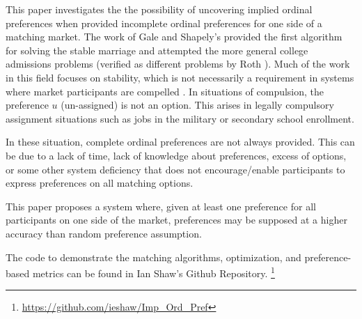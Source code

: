 This paper investigates the the possibility of uncovering implied ordinal preferences when provided incomplete ordinal preferences for one side of a matching market. The work of Gale and Shapely's \cite{gale_shapely} provided the first algorithm for solving the stable marriage and attempted the more general college admissions problems (verified as different problems by Roth \cite{canmp}). Much of the work in this field focuses on stability, which is not necessarily a requirement in systems where market participants are compelled \cite{incentives}. In situations of compulsion, the preference $u$ (un-assigned) is not an option. This arises in legally compulsory assignment situations such as jobs in the military or secondary school enrollment. 

In these situation, complete ordinal preferences are not always provided. This can be due to a lack of time, lack of knowledge about preferences, excess of options, or some other system deficiency that does not encourage/enable participants to express preferences on all matching options. 

This paper proposes a system where, given at least one preference for all participants on one side of the market, preferences may be supposed at a higher accuracy than random preference assumption.

The code to demonstrate the matching algorithms, optimization, and preference-based metrics can be found in Ian Shaw's Github Repository. \footnote{\url{https://github.com/ieshaw/Imp_Ord_Pref}}

